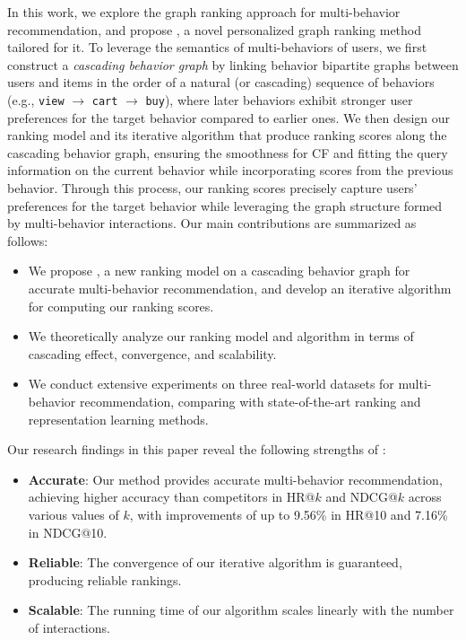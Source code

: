 In this work, we explore the graph ranking approach for multi-behavior recommendation, and propose \method, a novel personalized graph ranking method tailored for it.
To leverage the semantics of multi-behaviors of users, we first construct a \textit{cascading behavior graph} by linking behavior bipartite graphs between users and items in the order of a natural (or cascading) sequence of behaviors (e.g., \texttt{view} $\rightarrow$ \texttt{cart} $\rightarrow$ \texttt{buy}), where later behaviors exhibit stronger user preferences for the target behavior compared to earlier ones.
%
We then design our ranking model and its iterative algorithm that produce ranking scores along the cascading behavior graph, ensuring the smoothness for CF and fitting the query information on the current behavior while incorporating scores from the previous behavior.
Through this process, our ranking scores precisely capture users’ preferences for the target behavior while leveraging the graph structure formed by multi-behavior interactions.
%
Our main contributions are summarized as follows:
\begin{itemize}[leftmargin=9mm,noitemsep]
    \item {
        We propose \method, a new ranking model on a cascading behavior graph for accurate multi-behavior recommendation, and develop an iterative algorithm for computing our ranking scores.
    }
    \item {
        We theoretically analyze our ranking model and algorithm in terms of cascading effect, convergence, and scalability.
    }
    \item {
        We conduct extensive experiments on three real-world datasets for multi-behavior recommendation, comparing \method with state-of-the-art ranking and representation learning methods.
    }
\end{itemize}

Our research findings in this paper reveal the following strengths of \method:
\begin{itemize}[leftmargin=9mm,noitemsep]
    \item{
        \textbf{Accurate}:
        Our method provides accurate multi-behavior recommendation, achieving higher accuracy than competitors in HR@$k$ and NDCG@$k$ across various values of $k$, with improvements of up to 9.56\% in HR@10 and 7.16\% in NDCG@10.
    }
    \item{
        \textbf{Reliable}:
        The convergence of our iterative algorithm is guaranteed, producing reliable rankings.
    }
    \item{
        \textbf{Scalable}:
        The running time of our algorithm scales linearly with the number of interactions.
    }
\end{itemize}

